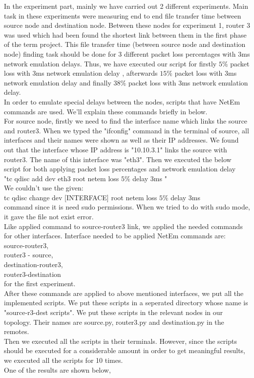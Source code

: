 \documentclass[conference]{IEEEtran}
\begin{document}
In the experiment part, mainly we have carried out 2 different experiments. Main task in these experiments were measuring end to end file transfer time between source node and destination node. Between these nodes for experiment 1, router 3 was used which had been found the shortest link between them in the first phase of the term project. This file transfer time (between source node and destination node) finding task should be done for 3 different packet loss percentages with 3ms network emulation delays. Thus, we have executed our script for firstly $5\%$ packet loss with 3ms network emulation delay , afterwards $15\%$ packet loss with 3ms network emulation delay and finally $38\%$ packet loss with 3ms network emulation delay.\\
In order to emulate special delays between the nodes, scripts that have NetEm commands are used. We'll explain these commands briefly in below.\\
For source node, firstly we need to find the interface name which links the source and router3. When we typed the "ifconfig" command in the terminal of source, all interfaces and their names were shown as well as their IP addresses. We found out that the interface whose IP address is "10.10.3.1" links the source with router3. The name of this interface was "eth3". Then we executed the below script for both applying packet loss percentages and network emulation delay\\
"tc qdisc add dev eth3 root netem loss $5\%$ delay 3ms "\\
We couldn't use the given:\\
tc qdisc change dev [INTERFACE] root netem loss $5\%$ delay 3ms\\ command since it is need sudo permissions. When we tried to do with sudo  mode, it gave the file not exist error.\\
Like applied command to source-router3 link, we applied the needed commands for other interfaces. Interface needed to be applied NetEm commands are:\\
source-router3,\\
router3 - source,\\
destination-router3,\\
router3-destination\\
for the first experiment.\\
After these commands are applied to above mentioned interfaces, we put all the implemented scripts. We put these scripts in a seperated directory whose name is "source-r3-dest scripts". We put these scripts in the relevant nodes in our topology. Their names are source.py, router3.py and destination.py in the remotes.\\
Then we executed all the scripts in their terminals. However, since the scripts should be executed for a considerable amount in order to get meaningful results, we executed all the scripts for 10 times. \\
One of the results are shown below,
\end{document}
